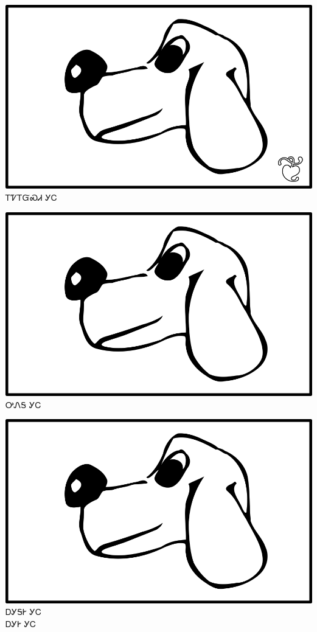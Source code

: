 \documentclass[avery5371]{flashcards}%
\begin{document}

    \begin{flashcard}{
        \includegraphics[width=0.95\columnwidth,height=.51\columnwidth,keepaspectratio]{../artwork/for-colors/gihli-with-leaf}
    }
        \Huge ᎢᏤᎢᏳᏍᏗ ᎩᏟ
    \end{flashcard}

    \begin{flashcard}{
        \includegraphics[width=0.95\columnwidth,height=.51\columnwidth,keepaspectratio]{../artwork/for-colors/gihli}
    }
        \Huge ᎤᏁᎦ ᎩᏟ
    \end{flashcard}

    \begin{flashcard}{
        \includegraphics[width=0.95\columnwidth,height=.51\columnwidth,keepaspectratio]{../artwork/for-colors/gihli}
    }
        \Huge ᎠᎩᎦᎨ ᎩᏟ\\ᎠᎩᎨ ᎩᏟ
    \end{flashcard}
\end{document}
